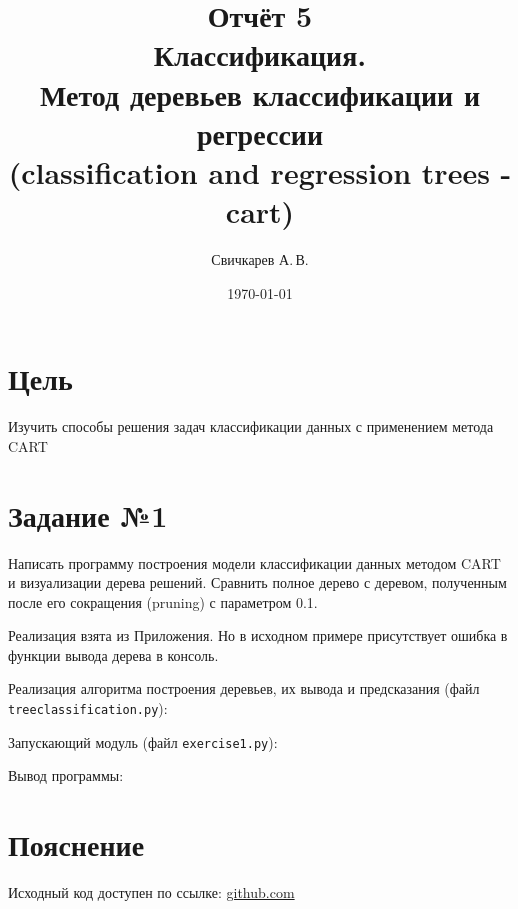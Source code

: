 \documentclass{article} %
\title{Отчёт 5\protect\\
    Классификация.\\
    Метод деревьев классификации и регрессии\\
    (classification and regression trees - cart)} %
\author{Свичкарев А.\,В.} %
\date{\today} %
\begin{document}

\maketitle %

\section{Цель}
Изучить способы решения задач классификации данных с
применением метода CART

\section{Задание №1}
Написать программу построения модели классификации данных методом CART и
визуализации дерева решений. Сравнить полное дерево с деревом, полученным после его
сокращения (pruning) с параметром 0.1.
\bigskip

Реализация взята из Приложения.
Но в исходном примере присутствует ошибка в функции вывода дерева в консоль.
\bigskip

Реализация алгоритма построения деревьев,
их вывода и предсказания (файл \verb$treeclassification.py$):

\clearpage
Запускающий модуль (файл \verb$exercise1.py$):
\bigskip

Вывод программы:


%
%
% 
%
%
%
%
%
% 
%

\section{Пояснение}
Исходный код доступен по ссылке:
\href{https://github.com/SvichkarevAnatoly/Course-Python-Bioinformatics/tree/master/semester2/task5}
{github.com}
\end{document}
